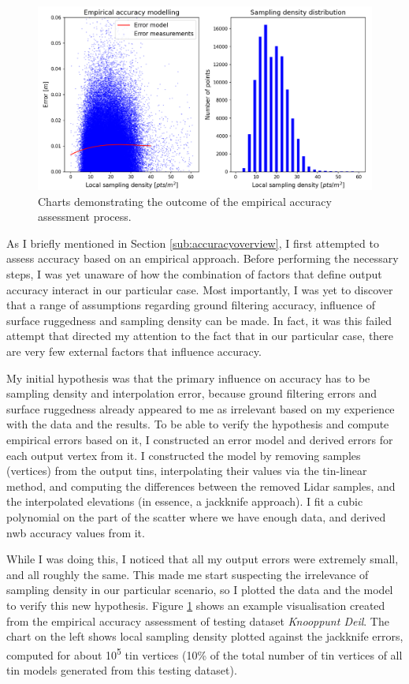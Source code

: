 \begin{figure}
    \centering
    \includegraphics[width=\linewidth]{final_report/figs/empiricalaccuracy0.png}
    \caption{Charts demonstrating the outcome of the empirical accuracy assessment process.}
    \label{fig:empiricalaccuracy0}
\end{figure}

As I briefly mentioned in Section \ref{sub:accuracyoverview}, I first attempted to assess accuracy based on an empirical approach. Before performing the necessary steps, I was yet unaware of how the combination of factors that define output accuracy interact in our particular case. Most importantly, I was yet to discover that a range of assumptions regarding ground filtering accuracy, influence of surface ruggedness and sampling density can be made. In fact, it was this failed attempt that directed my attention to the fact that in our particular case, there are very few external factors that influence accuracy.

My initial hypothesis was that the primary influence on accuracy has to be sampling density and interpolation error, because ground filtering errors and surface ruggedness already appeared to me as irrelevant based on my experience with the data and the results. To be able to verify the hypothesis and compute empirical errors based on it, I constructed an error model and derived errors for each output vertex from it. I constructed the model by removing samples (vertices) from the output \ac{tin}s, interpolating their values via the \ac{tin}-linear method, and computing the differences between the removed Lidar samples, and the interpolated elevations (in essence, a jackknife approach). I fit a cubic polynomial on the part of the scatter where we have enough data, and derived \ac{nwb} accuracy values from it.

While I was doing this, I noticed that all my output errors were extremely small, and all roughly the same. This made me start suspecting the irrelevance of sampling density in our particular scenario, so I plotted the data and the model to verify this new hypothesis. Figure \ref{fig:empiricalaccuracy0} shows an example visualisation created from the empirical accuracy assessment of testing dataset \textit{Knooppunt Deil}. The chart on the left shows local sampling density plotted against the jackknife errors, computed for about 10\textsuperscript{5} \ac{tin} vertices (10\% of the total number of \ac{tin} vertices of all \ac{tin} models generated from this testing dataset).

